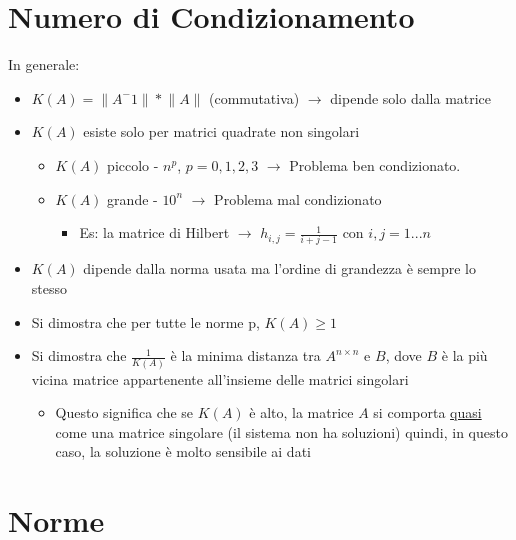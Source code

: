 \documentclass{article}
\newcommand\norm[1]{\lVert#1\rVert}	%
\begin{document}
	\section{Numero di Condizionamento}

		In generale:
		\begin{itemize}
			\item $K(A) = \norm{A^-1} * \norm{A}$ (commutativa) $\rightarrow$ dipende solo dalla matrice
			\item $K(A)$ esiste solo per matrici quadrate non singolari
			\begin{itemize}
				\item $K(A)$ piccolo - $n^p$, $p = 0, 1, 2, 3$ $\rightarrow$ Problema ben condizionato.
				\item $K(A)$ grande - $10^n$ $\rightarrow$ Problema mal condizionato
				\begin{itemize}
					\item Es: la matrice di Hilbert $\rightarrow$ $h_{i,j} = \frac{1}{i + j - 1}$ con $i, j = 1 ... n$
				\end{itemize}
			\end{itemize}
			\item $K(A)$ dipende dalla norma usata ma l'ordine di grandezza è sempre lo stesso
			\item Si dimostra che per tutte le norme p, $K(A) \geq 1$
			\item Si dimostra che $\frac{1}{K(A)}$ è la minima distanza tra $A^{n \times n}$ e $B$, dove $B$ è la più vicina matrice appartenente all'insieme delle matrici singolari
			\begin{itemize}
				\item Questo significa che se $K(A)$ è alto, la matrice $A$ si comporta \underline{quasi} come una matrice singolare (il sistema non ha soluzioni) quindi, in questo caso, la soluzione è molto sensibile ai dati
			\end{itemize}
		\end{itemize}

	\section{Norme}
\end{document}
